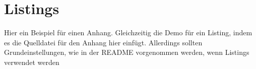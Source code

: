 \section{Listings}
\label{appendix_dummy}
  Hier ein Beispiel für einen Anhang.
  Gleichzeitig die Demo für ein Listing, indem es die Quelldatei für den Anhang hier einfügt.
  Allerdings sollten Grundeinstellungen, wie in der README vorgenommen werden, wenn Listings verwendet werden
  